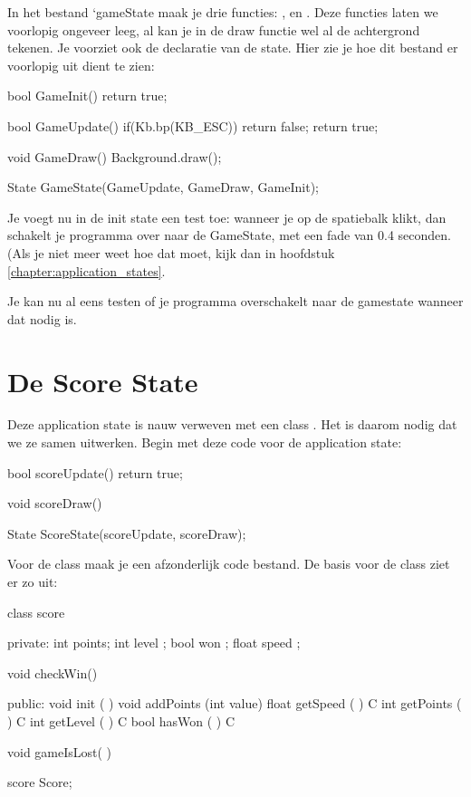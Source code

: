 In het bestand `gameState maak je drie functies: ,  en . Deze functies laten we voorlopig ongeveer leeg, al kan je in de draw functie wel al de achtergrond tekenen. Je voorziet ook de declaratie van de state. Hier zie je hoe dit bestand er voorlopig uit dient te zien:

\begin{code}
bool GameInit()
{
   return true;
}

bool GameUpdate()
{
   if(Kb.bp(KB_ESC)) return false;  
   return true;
}

void GameDraw()
{
   Background.draw();
}

State GameState(GameUpdate, GameDraw, GameInit);
\end{code}

Je voegt nu in de init state een test toe: wanneer je op de spatiebalk klikt, dan schakelt je programma over naar de GameState, met een fade van 0.4 seconden. (Als je niet meer weet hoe dat moet, kijk dan in hoofdstuk \ref{chapter:application_states}.

Je kan nu al eens testen of je programma overschakelt naar de gamestate wanneer dat nodig is.

\section{De Score State}

Deze application state is nauw verweven met een class . Het is daarom nodig dat we ze samen uitwerken. Begin met deze code voor de application state:

\begin{code}
bool scoreUpdate() { 
  return true;
}

void scoreDraw() {}

State ScoreState(scoreUpdate, scoreDraw);
\end{code}

Voor de class  maak je een afzonderlijk code bestand. De basis voor de class  ziet er zo uit:

\begin{code}
class score
{
private:
   int   points;
   int   level ;
   bool  won   ;
   float speed ;
   
   void checkWin() {}
   
public:   
   void  init      (         )   {}   
   void  addPoints (int value)   {}   
   float getSpeed  (         ) C {}
   int   getPoints (         ) C {}
   int   getLevel  (         ) C {}
   bool  hasWon    (         ) C {}
   
   void  gameIsLost(         )   {}
}

score Score;
\end{code}

